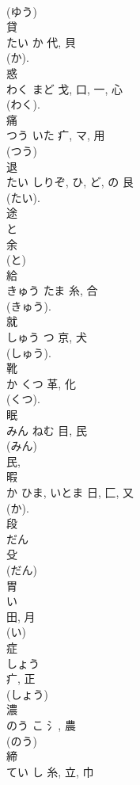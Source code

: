 \documentclass[8pt]{extreport}
\begin{document}
\begin{CJK}{UTF8}{min}
\\	(ゆう) 
\\	貸	
\\	たい	か	代, 貝	
\\	(か). 
\\	惑	
\\	わく	まど	戈, 口, 一, 心	
\\	(わく). 
\\	痛	
\\	つう	いた	疒, マ, 用	
\\	(つう) 
\\	退	
\\	たい	しりぞ, ひ, ど, の	艮		
\\	(たい). 
\\	途	
\\	と	
\\	余		
\\	(と) 
\\	給	
\\	きゅう	たま	糸, 合	
\\	(きゅう). 
\\	就	
\\	しゅう	つ	京, 犬	
\\	(しゅう). 
\\	靴	
\\	か	くつ	革, 化	
\\	(くつ). 
\\	眠	
\\	みん	ねむ	目, 民	
\\	(みん) 
\\	民, 
\\	暇	
\\	か	ひま, いとま	日, 匚, 又		
\\	(か). 
\\	段	
\\	だん	
\\	殳		
\\	(だん) 
\\	胃	
\\	い	
\\	田, 月	
\\	(い) 
\\	症	
\\	しょう	
\\	疒, 正	
\\	(しょう) 
\\	濃	
\\	のう	こ	氵, 農	
\\	(のう) 
\\	締	
\\	てい	し	糸, 立, 巾	

\end{CJK}
\end{document}
